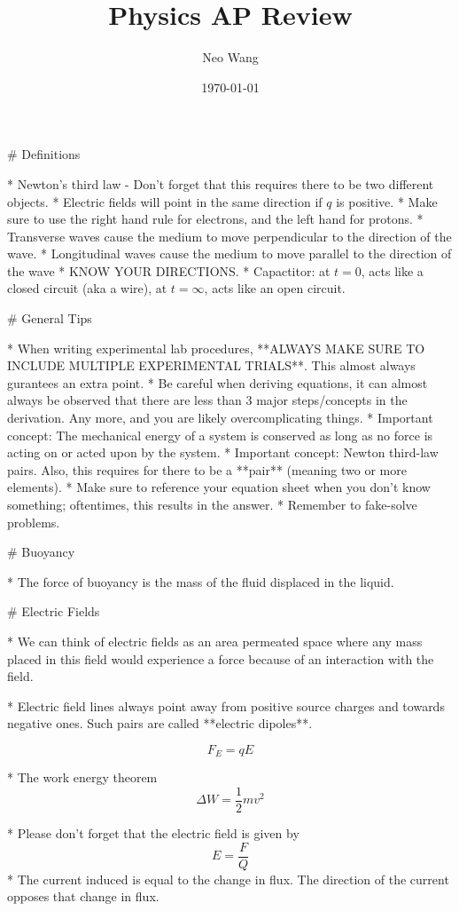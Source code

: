 \documentclass{article}
\title{Physics AP Review}
\author{Neo Wang}
\date{\today}
\begin{document}
\maketitle
\tableofcontents

\begin{markdown}

# Definitions

* Newton's third law - Don't forget that this requires there to be two different objects.
* Electric fields will point in the same direction if $q$ is positive.
* Make sure to use the right hand rule for electrons, and the left hand for protons.
* Transverse waves cause the medium to move perpendicular to the direction of the wave.
* Longitudinal waves cause the medium to move parallel to the direction of the wave
* KNOW YOUR DIRECTIONS.
* Capactitor: at $t=0$, acts like a closed circuit (aka a wire), at $t=\infty$, acts like an open circuit.

# General Tips

* When writing experimental lab procedures, **ALWAYS MAKE SURE TO INCLUDE MULTIPLE EXPERIMENTAL TRIALS**. This almost always gurantees an extra point.
* Be careful when deriving equations, it can almost always be observed that there are less than 3 major steps/concepts in the derivation. Any more, and you are likely overcomplicating things.
* Important concept: The mechanical energy of a system is conserved as long as no force is acting on or acted upon by the system.
* Important concept: Newton third-law pairs. Also, this requires for there to be a **pair** (meaning two or more elements).
* Make sure to reference your equation sheet when you don't know something; oftentimes, this results in the answer.
* Remember to fake-solve problems.

# Buoyancy

* The force of buoyancy is the mass of the fluid displaced in the liquid.

# Electric Fields

* We can think of electric fields as an area permeated space where any mass placed in this field would experience a force because of an interaction with the field.

* Electric field lines always point away from positive source charges and towards negative ones. Such pairs are called **electric dipoles**.

$$
F_E = qE
$$

* The work energy theorem $$\Delta W = \frac{1}{2}mv^2$$

* Please don't forget that the electric field is given by $$E = \frac{F}{Q}$$
* The current induced is equal to the change in flux. The direction of the current opposes that change in flux.


\end{markdown}
\end{document}
